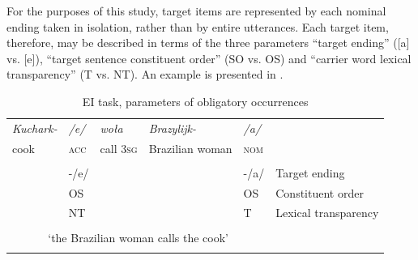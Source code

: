 \begin{table}
    \caption{EI task, target sentences}
    \label{tab:02:11}
\end{table}

For the purposes of this study, target items are represented by each nominal ending taken in isolation, rather than by entire utterances. Each target item, therefore, may be described in terms of the three parameters “target ending” ([a] vs. [e]), “target sentence constituent order” (SO vs. OS) and “carrier word lexical transparency” (T vs. NT). An example is presented in .

\begin{table}
    \begin{tabularx}{\textwidth}{llllll}
    \lsptoprule
         \textit{Kuchark-} & \textit{/e/} & \textit{woła} &  \textit{Brazylijk-} & \textit{/a/} & \\
          cook & \textsc{acc} & call \textsc{3sg} &  Brazilian woman & \textsc{nom} & \\
        &  &  &  &  & \\
        & {}-/e/ &  &  & {}-/a/ & Target ending\\
        & OS &  &  & OS & Constituent order\\
        & NT &  &  & T & Lexical transparency\\
        \multicolumn{5}{c}{} & \\
        \multicolumn{5}{c}{‘the Brazilian woman calls the cook’} & \\
    \lspbottomrule
    \end{tabularx}
    \caption{EI task, parameters of obligatory occurrences}
    \label{tab:02:12}
\end{table}

